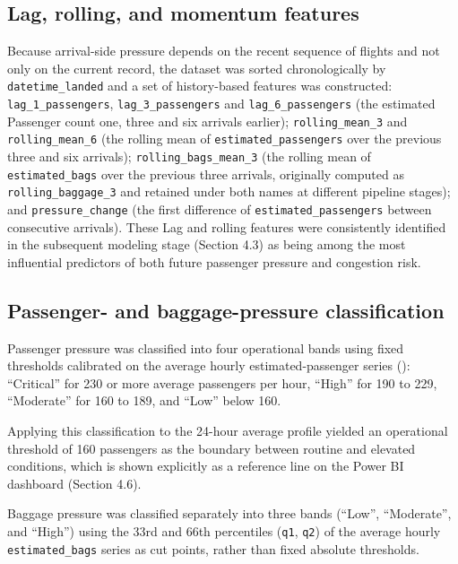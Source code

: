 \subsection{Lag, rolling, and momentum features}
\label{subsec:lag-rolling-momentum-features}

Because arrival-side pressure depends on the recent sequence of flights and not only on the current record, the dataset was sorted chronologically by \nolinkurl{datetime_landed} and a set of history-based features was constructed: \nolinkurl{lag_1_passengers}, \nolinkurl{lag_3_passengers} and \nolinkurl{lag_6_passengers} (the estimated Passenger count one, three and six arrivals earlier); \nolinkurl{rolling_mean_3} and \nolinkurl{rolling_mean_6} (the rolling mean of \nolinkurl{estimated_passengers} over the previous three and six arrivals); \nolinkurl{rolling_bags_mean_3} (the rolling mean of \nolinkurl{estimated_bags} over the previous three arrivals, originally computed as \nolinkurl{rolling_baggage_3} and retained under both names at different pipeline stages); and \nolinkurl{pressure_change} (the first difference of \nolinkurl{estimated_passengers} between consecutive arrivals). These Lag and rolling features were consistently identified in the subsequent modeling stage (Section 4.3) as being among the most influential predictors of both future passenger pressure and congestion risk.

\subsection{Passenger- and baggage-pressure classification}
\label{subsec:pressure-classification}

Passenger pressure was classified into four operational bands using fixed
thresholds calibrated on the average hourly estimated-passenger series
():
``Critical'' for 230 or more average passengers per hour, ``High'' for
190 to 229, ``Moderate'' for 160 to 189, and ``Low'' below 160.

Applying this classification to the 24-hour average profile yielded an
operational threshold of 160 passengers as the boundary between routine
and elevated conditions, which is shown explicitly as a reference line
on the Power BI dashboard (Section 4.6).

Baggage pressure was classified separately into three bands
(``Low'', ``Moderate'', and ``High'') using the 33rd and 66th percentiles
(\texttt{q1}, \texttt{q2}) of the average hourly
\nolinkurl{estimated_bags} series as cut points, rather than fixed absolute
thresholds.

